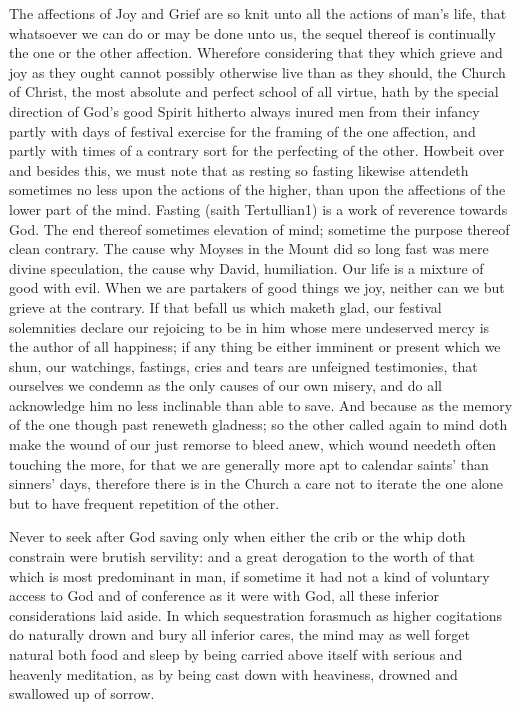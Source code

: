 The affections of Joy and Grief are so knit unto all the actions of man’s life, that whatsoever we can do or may be done unto us, the sequel thereof is continually the one or the other affection. Wherefore considering that they which  grieve and joy as they ought cannot possibly otherwise live than as they should, the Church of Christ, the most absolute and perfect school of all virtue, hath by the special direction of God’s good Spirit hitherto always inured men from their infancy partly with days of festival exercise for the framing of the one affection, and partly with times of a contrary sort for the perfecting of the other. Howbeit over and besides this, we must note that as resting so fasting likewise attendeth sometimes no less upon the actions of the higher, than upon the affections of the lower part of the mind. Fasting (saith Tertullian1) is a work of reverence towards God. The end thereof sometimes elevation of mind; sometime the purpose thereof clean contrary. The cause why Moyses in the Mount did so long fast was mere divine speculation, the cause why David, humiliation. Our life is a mixture of good with evil. When we are partakers of good things we joy, neither can we but grieve at the contrary. If that befall us which maketh glad, our festival solemnities declare our rejoicing to be in him whose mere undeserved mercy is the author of all happiness; if any thing be either imminent or present which we shun, our watchings, fastings, cries and tears are unfeigned testimonies, that ourselves we condemn as the only causes of our own misery, and do all acknowledge him no less inclinable than able to save. And because as the memory of the one  though past reneweth gladness;
 so the other called again to mind doth make the wound of our just remorse to bleed anew, which wound needeth often touching the more, for that we are generally more apt to calendar saints’ than sinners’ days, therefore there is in the Church a care not to iterate the one alone but to have frequent repetition of the other.

Never to seek after God saving only when either the crib or the whip doth constrain were brutish servility: and a great derogation to the worth of that which is most predominant in man, if sometime it had not a kind of voluntary access to God and of conference as it were with God, all these inferior considerations laid aside. In which sequestration forasmuch as higher cogitations do naturally drown and bury all inferior cares, the mind may as well forget natural both food and sleep by being carried above itself with serious and heavenly meditation, as by being cast down with heaviness, drowned and swallowed up of sorrow.

